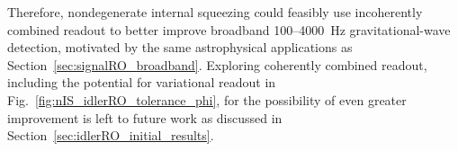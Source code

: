 Therefore, nondegenerate internal squeezing could feasibly use incoherently combined readout to better improve broadband 100--4000~Hz  gravitational-wave detection, motivated by the same astrophysical applications as Section~\ref{sec:signalRO_broadband}. %
Exploring coherently combined readout, including the potential for variational readout in Fig.~\ref{fig:nIS_idlerRO_tolerance_phi}, for the possibility of even greater improvement is left to future work as discussed in Section~\ref{sec:idlerRO_initial_results}. %



